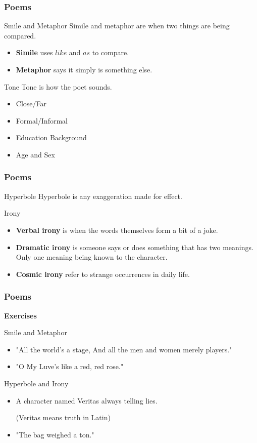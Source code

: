 \documentclass{beamer}
\begin{document}
\begin{frame}
\frametitle{Poems}
\begin{block}{Smile and Metaphor}
Simile and metaphor are when two things are being compared.
\begin{itemize}
\item \textbf{Simile} uses $like$ and $as$ to compare. 
\item \textbf{Metaphor} says it simply is something else. 
\end{itemize}
\end{block}

\begin{block}{Tone}
Tone is how the poet sounds.
\begin{itemize}
\item Close/Far
\item Formal/Informal
\item Education Background 
\item Age and Sex
\end{itemize}
\end{block}
\end{frame}
\begin{frame}
\frametitle{Poems}
\begin{block}{Hyperbole}
Hyperbole is any exaggeration made for effect.
\end{block}

\begin{block}{Irony}
\begin{itemize}
\item \textbf{Verbal irony} is when the words themselves form a bit of a joke. 
\item \textbf{Dramatic irony} is someone says or does something that has two meanings. Only one meaning being known to the character. 
\item \textbf{Cosmic irony} refer to strange occurrences in daily life.
\end{itemize}
\end{block}
\end{frame}
\begin{frame}
\frametitle{Poems}
\textbf{Exercises}
\begin{block}{Smile and Metaphor}
\begin{itemize}
\item "All the world's a stage, And all the men and women merely players."
\item "O My Luve's like a red, red rose."
\end{itemize}
\end{block}

\begin{block}{Hyperbole and Irony}
\begin{itemize}
\item A character named Veritas always telling lies. 

(Veritas means truth in Latin)
\item "The bag weighed a ton."
\end{itemize}
\end{block}
\end{frame}
\end{document}
